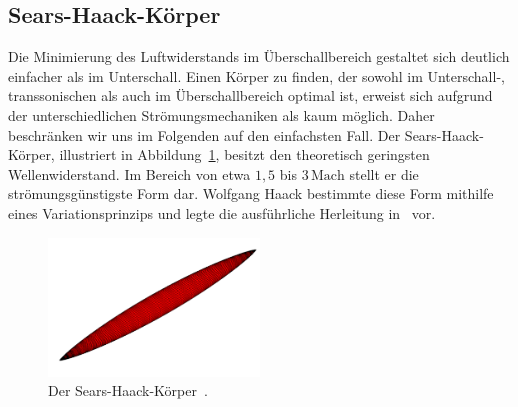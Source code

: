 \subsection{Sears-Haack-Körper}
Die Minimierung des Luftwiderstands im Überschallbereich 
gestaltet sich deutlich einfacher als im Unterschall. 
Einen Körper zu finden, der sowohl im Unterschall-, 
transsonischen als auch im Überschallbereich optimal ist, 
erweist sich aufgrund der unterschiedlichen 
Strömungsmechaniken als kaum möglich.
Daher beschränken wir uns im Folgenden auf den einfachsten Fall.
Der Sears-Haack-Körper, illustriert in Abbildung~\ref{fig:sears_haack}, 
besitzt den theoretisch geringsten Wellenwiderstand. 
Im Bereich von etwa $1{,}5$ bis $3\,\mathrm{Mach}$ 
stellt er die strömungsgünstigste Form dar. 
Wolfgang Haack bestimmte diese Form mithilfe eines 
Variationsprinzips und legte die ausführliche Herleitung 
in~\cite{Haack1941} vor.
\begin{figure}
    \centering
    \includegraphics[width=0.5\textwidth]{papers/ueberschall/figures/Sears-Haack.png}
    \caption{Der Sears-Haack-Körper~\cite{SearsHaackWikipedia}.}
    \label{fig:sears_haack}
\end{figure}

